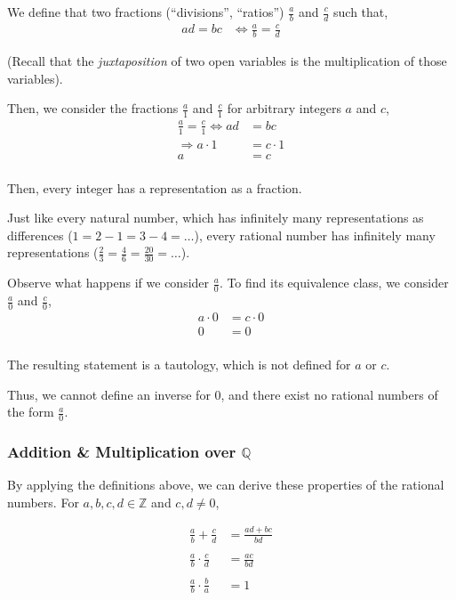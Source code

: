 \documentclass[letterpaper,twoside]{article}
\begin{document}
\begin{multicols}{2}
We define that two fractions (``divisions'', ``ratios'') $\frac{a}{b}$ and $\frac{c}{d}$ such that,
\begin{align}
    ad = bc &\Longleftrightarrow \frac{a}{b} = \frac{c}{d}
\end{align}

(Recall that the \textit{juxtaposition} of two open variables is the multiplication of those variables).

Then, we consider the fractions $\frac{a}{1}$ and $\frac{c}{1}$ for arbitrary integers $a$ and $c$,
\begin{align*}
    \frac{a}{1} = \frac{c}{1} \Longleftrightarrow ad &= bc\\
    \Longrightarrow a\cdot 1 &= c\cdot 1\\
    a &= c\\
\end{align*}

Then, every integer has a representation as a fraction.

Just like every natural number, which has infinitely many representations as differences ($1 = 2 - 1 = 3 - 4 = \ldots$), every rational number has infinitely many representations ($\frac{2}{3} = \frac{4}{6} = \frac{20}{30} = \ldots$).

Observe what happens if we consider $\frac{a}{0}$.
To find its equivalence class, we consider $\frac{a}{0}$ and $\frac{c}{0}$,
\begin{align*}
    a\cdot 0 &= c \cdot 0\\
    0 &= 0\\
\end{align*}

The resulting statement is a tautology, which is not defined for $a$ or $c$.

Thus, we cannot define an inverse for 0, and there exist no rational numbers of the form $\frac{a}{0}$.

\subsubsection{Addition \& Multiplication over $\mathbb{Q}$}

By applying the definitions above, we can derive these properties of the rational numbers.
For $a,b,c,d \in \mathbb{Z}$ and $c,d \neq 0$,

\begin{align*}
    \frac{a}{b}+\frac{c}{d} &= \frac{ad+bc}{bd}\\
    \\
    \frac{a}{b}\cdot \frac{c}{d} &= \frac{ac}{bd}\\
    \\
    \frac{a}{b}\cdot \frac{b}{a} &= 1
\end{align*}


\end{multicols}
\end{document}
